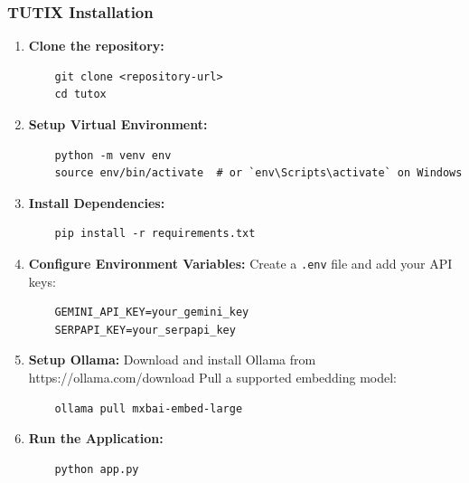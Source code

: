 \documentclass[12pt, conference]{IEEEtran}
\begin{document}
\subsubsection*{TUTIX Installation}
\begin{enumerate}
    \item \textbf{Clone the repository:}
    \begin{verbatim}
    git clone <repository-url>
    cd tutox
    \end{verbatim}

    \item \textbf{Setup Virtual Environment:}
    \begin{verbatim}
    python -m venv env
    source env/bin/activate  # or `env\Scripts\activate` on Windows
    \end{verbatim}

    \item \textbf{Install Dependencies:}
    \begin{verbatim}
    pip install -r requirements.txt
    \end{verbatim}

    \item \textbf{Configure Environment Variables:}
    Create a \texttt{.env} file and add your API keys:
    \begin{verbatim}
    GEMINI_API_KEY=your_gemini_key
    SERPAPI_KEY=your_serpapi_key
    \end{verbatim}

    \item \textbf{Setup Ollama:}
    Download and install Ollama from https://ollama.com/download
    Pull a supported embedding model:
    \begin{verbatim}
    ollama pull mxbai-embed-large
    \end{verbatim}

    \item \textbf{Run the Application:}
    \begin{verbatim}
    python app.py
    \end{verbatim}
\end{enumerate}
\end{document}
